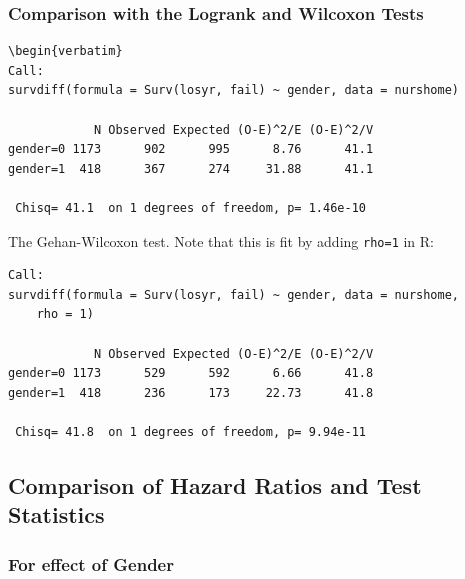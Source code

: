 \documentclass[11pt,psfig]{book}
\begin{document}
\subsubsection{Comparison with the Logrank and Wilcoxon Tests}
\small
\begin{verbatim}
\begin{verbatim}
Call:
survdiff(formula = Surv(losyr, fail) ~ gender, data = nurshome)

            N Observed Expected (O-E)^2/E (O-E)^2/V
gender=0 1173      902      995      8.76      41.1
gender=1  418      367      274     31.88      41.1

 Chisq= 41.1  on 1 degrees of freedom, p= 1.46e-10
 \end{verbatim}
\normalsize
The Gehan-Wilcoxon test.  Note that this is fit by adding {\tt rho=1} in R:
\small
\begin{verbatim}
Call:
survdiff(formula = Surv(losyr, fail) ~ gender, data = nurshome,
    rho = 1)

            N Observed Expected (O-E)^2/E (O-E)^2/V
gender=0 1173      529      592      6.66      41.8
gender=1  418      236      173     22.73      41.8

 Chisq= 41.8  on 1 degrees of freedom, p= 9.94e-11
\end{verbatim}
\normalsize
\subsection{Comparison of Hazard Ratios and Test Statistics}
\subsubsection{For effect of Gender}
\end{document}

